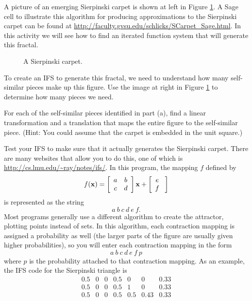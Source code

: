 \begin{pactivity} \label{IFS_carpet} A picture of an emerging Sierpinski carpet is shown at left in Figure \ref{F:Scarpet}. A Sage cell to illustrate this algorithm for producing approximations to the Sierpinski carpet can be found at \url{http://faculty.gvsu.edu/schlicks/SCarpet_Sage.html}. In this activity we will see how to find an iterated function system that will generate this fractal. 
\begin{figure}[h]
\begin{center}
\caption{A Sierpinski carpet.}
\label{F:Scarpet}
\end{center}
\end{figure}
\ba
\item To create an IFS to generate this fractal, we need to understand how many self-similar pieces make up this figure. Use the image at right in Figure \ref{F:Scarpet} to determine how many pieces we need. 


\item For each of the self-similar pieces identified in part (a), find a linear transformation and a translation that maps the entire figure to the self-similar piece. (Hint: You could assume that the carpet is embedded in the unit square.)


\item Test your IFS to make sure that it actually generates the Sierpinski carpet. There are many websites that allow you to do this, one of which is \url{http://cs.lmu.edu/~ray/notes/ifs/}. In this program, the mapping $f$ defined by 
\[f(\mathbf{x}) = \left[ \begin{array}{cc} a&b\\c&d \end{array} \right] \mathbf{x} + \left[ \begin{array}{c} e\\f \end{array}\ \right]\]
is represented as the string
\[a \ b \ c \ d \ e \ f.\]
Most programs generally use a different algorithm to create the attractor, plotting points instead of sets. In this algorithm, each contraction mapping is assigned a probability as well (the larger parts of the figure are usually given higher probabilities),  so you will enter each contraction mapping in the form
\[a \ b \ c \ d \ e \ f \ p\]
where $p$ is the probability attached to that contraction mapping. As an example, the IFS code for the Sierpinski triangle is 
\[\begin{array}{ccccccc}
0.5	&0	&0	&0.5	&0	&0		&0.33 \\
0.5	&0	&0	&0.5	&1	&0		&0.33 \\
0.5	&0	&0	&0.5	&0.5	&0.43	&0.33 
\end{array}\]

\ea

\end{pactivity}

